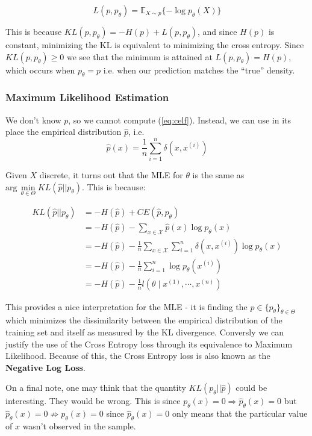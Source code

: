 \documentclass[]{article}
\theoremstyle{mattstyle}
\theoremstyle{definition}
\begin{document}
\begin{equation}\label{eq:celf}
L(p,p_{\theta}) = \mathbb{E}_{X\sim p}\{ -\log p_{\theta}(X) \}
\end{equation}	

This is because $KL(p,p_{\theta}) = -H(p) + L(p,p_{\theta})$, and since $H(p)$ is constant, minimizing the KL is equivalent to minimizing the cross entropy. Since $KL(p,p_{\theta}) \ge 0$ we see that the minimum is attained at $L(p,p_{\theta}) = H(p)$, which occurs when $p_{\theta}=p$ i.e. when our prediction matches the ``true'' density.


\subsubsection{Maximum Likelihood Estimation}

We don't know $p$, so we cannot compute (\ref{eq:celf}). Instead, we can use in its place the empirical distribution $\hat{p}$, i.e. 
\begin{equation}
\hat{p}(x) = \frac{1}{n}\sum_{i=1}^n\delta(x,x^{(i)})
\end{equation}

Given $X$ discrete, it turns out that the MLE for $\theta$ is the same as $\text{arg}\,\min\limits_{\theta\in\Theta} KL(\hat{p}||p_{\theta})$. This is because:

\begin{align*}
KL(\hat{p}||p_{\theta}) &= -H(\hat{p}) + CE(\hat{p},p_{\theta}) \\
&= -H(\hat{p}) - \sum_{x\in\mathcal{X}}\hat{p}(x)\log p_{\theta}(x)\\
&= -H(\hat{p}) - \frac{1}{n}\sum_{x\in\mathcal{X}}\sum_{i=1}^n\delta(x,x^{(i)}) \log p_{\theta}(x)\\
&= -H(\hat{p}) - \frac{1}{n}\sum_{i=1}^n\log p_{\theta}(x^{(i)})\\
&= -H(\hat{p}) - \frac{1}{n}l(\theta \mid x^{(1)}, \cdots, x^{(n)})
\end{align*}

This provides a nice interpretation for the MLE - it is finding the $p\in \{p_{\theta}\}_{\theta\in\Theta}$ which minimizes the dissimilarity between the empirical distribution of the training set and itself as measured by the KL divergence. Conversly we can justify the use of the Cross Entropy loss through its equivalence to Maximum Likelihood. Because of this, the Cross Entropy loss is also known as the \textbf{Negative Log Loss}.

On a final note, one may think that the quantity $KL(p_{\theta}|| \hat{p})$ could be interesting. They would be wrong. This is since $p_{\theta}(x)=0 \Rightarrow \hat{p}_{\theta}(x)=0$ but $\hat{p}_{\theta}(x)=0 \not\Rightarrow p_{\theta}(x)=0$ since $\hat{p}_{\theta}(x)=0$ only means that the particular value of $x$ wasn't observed in the sample.	
\end{document}
